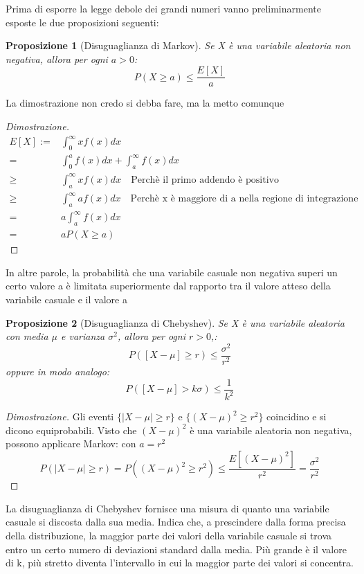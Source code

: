 \documentclass[12pt]{article}
\newtheorem{proposition}{Proposizione}[section]
\begin{document}
Prima di esporre la legge debole dei grandi numeri vanno preliminarmente esposte
le due proposizioni seguenti: 

\begin{proposition} [Disuguaglianza di Markov]
    Se X è una variabile aleatoria non negativa, allora per ogni \(a > 0\):
    \[
    P(X \ge a) \le \frac{E[X]}{a}    
    \]
\end{proposition}
La dimostrazione non credo si debba fare, ma la metto comunque
\begin{proof}[Dimostrazione]
    \begin{align*}
        E[X] := & \int_{0}^{\infty} xf(x)dx \\
        = & \int_{0}^{a}f(x)dx + \int_{a}^{\infty}f(x)dx \\
        \ge & \int_{a}^{\infty}xf(x)dx \quad \text{Perchè il primo addendo è positivo}\\
        \ge & \int_{a}^{\infty}af(x)dx \quad \text{Perchè x è maggiore di a nella regione di integrazione} \\
        = &  a\int_{a}^{\infty}f(x)dx \\
        = &  aP(X \ge a)
    \end{align*}
\end{proof}

In altre parole, la probabilità che una variabile casuale non negativa superi un certo valore a è limitata superiormente dal rapporto tra il valore atteso della variabile casuale e il valore a
\newpage
\begin{proposition}[Disuguaglianza di Chebyshev]
    Se X è una variabile aleatoria con media \(\mu\) e varianza \(\sigma^2\),
    allora per ogni \(r > 0\),: 
    \[
    P([X-\mu] \ge r) \le \frac{\sigma^2}{r^2}    
    \]
    oppure in modo analogo: 
    \[
    P([X-\mu] > k\sigma) \le \frac{1}{k^2}    
    \]
\end{proposition}

\begin{proof}[Dimostrazione]
    Gli eventi \(\{|X-\mu|\ge r\}\) e \(\{(X-\mu)^2 \ge r^2\}\) coincidino e si dicono 
    equiprobabili. 
    \newline
    Visto che \((X-\mu)^2\) è una variabile aleatoria non negativa, possono applicare Markov:
    con \(a = r^2\)
    \[
    P(|X-\mu| \ge r) = P((X-\mu)^2 \ge r^2) \le \frac{E[(X-\mu)^2]}{r^2} = \frac{\sigma^2}{r^2}    
    \] 
\end{proof}

La disuguaglianza di Chebyshev fornisce una misura di quanto una 
variabile casuale si discosta dalla sua media. 
Indica che, a prescindere dalla forma precisa della distribuzione, 
la maggior parte dei valori della variabile casuale si trova entro un certo 
numero di deviazioni standard dalla media. Più grande è il valore di k, 
più stretto diventa l'intervallo in cui la maggior parte dei valori si concentra.
\end{document}
